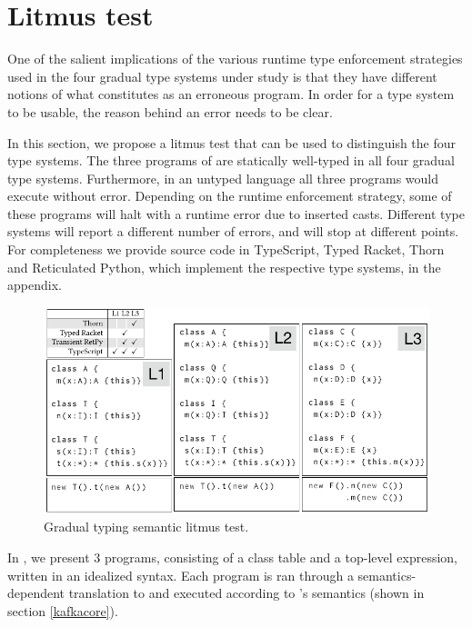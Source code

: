 \documentclass[runnningheads]{tex/llncs}
\begin{document}


\section{Litmus test}\label{litmustest}


One of the salient implications of the various runtime type enforcement
strategies used in the four gradual type systems under study is that they
have different notions of what constitutes as an erroneous program.
In order for a type system to be usable, the reason behind an error needs to
be clear.

In this section, we propose a litmus test that can be used to distinguish
the four type systems. The three programs of  are statically
well-typed in all four gradual type systems. Furthermore, in an untyped
language all three programs would execute without error. Depending on the
runtime enforcement strategy, some of these programs will halt with a runtime
error due to inserted casts. Different type systems will report a different
number of errors, and will stop at different points. For completeness we
provide source code in TypeScript, Typed Racket, Thorn and Reticulated
Python, which implement the respective type systems, in the appendix.

\begin{figure}[!h]
	\includegraphics[width=.95\columnwidth]{../figures/litm}
	\caption{Gradual typing semantic litmus test.}\label{litmus}
\end{figure}

In , we present 3 programs, consisting of a class table and a
top-level expression, written in an idealized syntax. Each program is ran
through a semantics-dependent translation to \kafka and executed according to
\kafka's semantics (shown in section \ref{kafkacore}).
\end{document}
